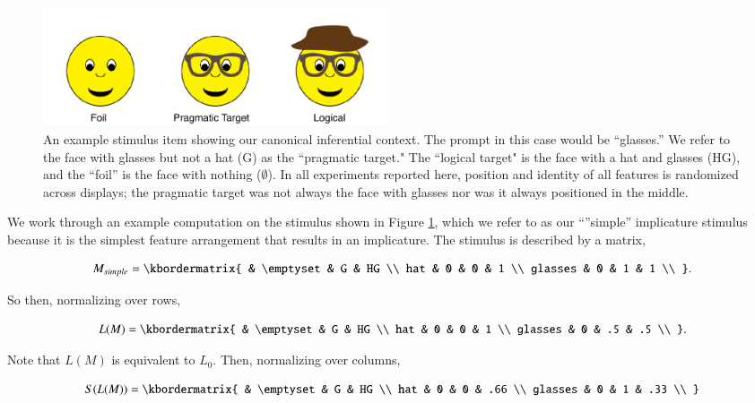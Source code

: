 \documentclass[man,noapacite]{apa2}
\begin{document}
\begin{figure}[t]
  \centering
  \includegraphics[width=4in]{figures/hatglasses.pdf}
  \caption{\label{fig:ex} An example stimulus item showing our canonical inferential context. The prompt in this case would be ``glasses.'' We refer to the face with glasses but not a hat ({\sc G}) as the ``pragmatic target." The  ``logical target"  is the face with a hat and glasses ({\sc HG}), and the ``foil'' is the face with nothing ($\emptyset$). In all experiments reported here, position and identity of all features is randomized across displays; the pragmatic target was not always the face with glasses nor was it always positioned in the middle.}
\end{figure}

We work through an example computation on the stimulus shown in Figure \ref{fig:ex}, which we refer to as our ``''simple'' implicature stimulus because it is the simplest feature arrangement that results in an implicature. The stimulus is described by a matrix,

\begin{equation}
  M_{simple} = \kbordermatrix{
    & \emptyset & G & HG \\
    hat & 0 & 0 & 1  \\
    glasses & 0 & 1 & 1 \\
  }.
\end{equation}

\noindent So then, normalizing over rows,


\begin{equation}
  L(M) = \kbordermatrix{
    & \emptyset & G & HG \\
    hat & 0 & 0 & 1 \\
    glasses & 0 & .5 & .5 \\
  }.
\end{equation}

\noindent Note that $L(M)$ is equivalent to $L_0$. Then, normalizing over columns,

\begin{equation}
    S(L(M)) = \kbordermatrix{
      & \emptyset & G & HG \\
      hat & 0 & 0 & .66  \\
      glasses & 0 & 1 & .33 \\
    }
\end{equation}
\end{document}
